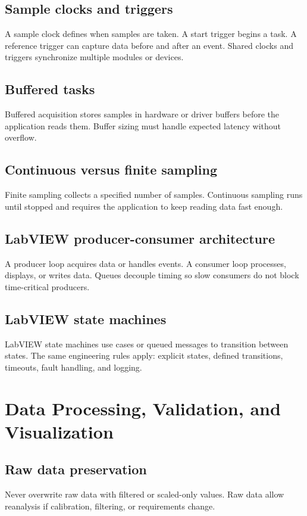 \documentclass[11pt]{article}
\begin{document}
\subsection{Sample clocks and triggers}
A sample clock defines when samples are taken. A start trigger begins a task. A
reference trigger can capture data before and after an event. Shared clocks and
triggers synchronize multiple modules or devices.

\subsection{Buffered tasks}
Buffered acquisition stores samples in hardware or driver buffers before the
application reads them. Buffer sizing must handle expected latency without
overflow.

\subsection{Continuous versus finite sampling}
Finite sampling collects a specified number of samples. Continuous sampling runs
until stopped and requires the application to keep reading data fast enough.

\subsection{LabVIEW producer-consumer architecture}
A producer loop acquires data or handles events. A consumer loop processes,
displays, or writes data. Queues decouple timing so slow consumers do not block
time-critical producers.

\subsection{LabVIEW state machines}
LabVIEW state machines use cases or queued messages to transition between
states. The same engineering rules apply: explicit states, defined transitions,
timeouts, fault handling, and logging.

\section{Data Processing, Validation, and Visualization}

\subsection{Raw data preservation}
Never overwrite raw data with filtered or scaled-only values. Raw data allow
reanalysis if calibration, filtering, or requirements change.
\end{document}
